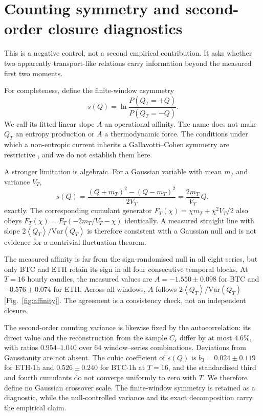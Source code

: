 \documentclass[aps,pre,twocolumn,superscriptaddress,floatfix,nofootinbib]{revtex4-2}
\newcommand{\eps}{\varepsilon}
\newcommand{\avg}[1]{\left\langle #1 \right\rangle}
\newcommand{\Var}{\mathrm{Var}}
\begin{document}
\iffalse
\section{Counting symmetry and second-order closure diagnostics}
\label{sec:identity}

This is a negative control, not a second empirical contribution. It asks
whether two apparently transport-like relations carry information beyond the
measured first two moments.

For completeness, define the finite-window asymmetry
\begin{equation}
  s(Q)=\ln\frac{P(Q_T=+Q)}{P(Q_T=-Q)} .
\end{equation}
We call its fitted linear slope $A$ an operational affinity. The name does not
make $Q_T$ an entropy production or $A$ a thermodynamic force. The conditions
under which a non-entropic current inherits a Gallavotti--Cohen symmetry are
restrictive \cite{barato2012}, and we do not establish them here.

A stronger limitation is algebraic. For a Gaussian variable with mean $m_T$
and variance $V_T$,
\begin{equation}
  s(Q)=\frac{(Q+m_T)^2-(Q-m_T)^2}{2V_T}
      =\frac{2m_T}{V_T}\,Q ,
  \label{eq:identity}
\end{equation}
exactly. The corresponding cumulant generator
$F_T(\chi)=\chi m_T+\chi^2V_T/2$ also obeys
$F_T(\chi)=F_T(-2m_T/V_T-\chi)$ identically. A measured straight line with
slope $2\avg{Q_T}/\Var(Q_T)$ is therefore consistent with a Gaussian null and
is not evidence for a nontrivial fluctuation theorem.

The measured affinity is far from the sign-randomised null in all eight
series, but only BTC and ETH retain its sign in all four consecutive temporal
blocks. At $T=16$ hourly candles, the measured values are
$A=-1.550\pm0.098$ for BTC and $-0.576\pm0.074$ for ETH. Across all windows,
$A$ follows $2\avg{Q_T}/\Var(Q_T)$ [Fig.~\ref{fig:affinity}]. The agreement is
a consistency check, not an independent closure.

The second-order counting variance is likewise fixed by the autocorrelation:
its direct value and the reconstruction from the sample $C_\eps$ differ by at
most $4.6\%$, with ratios $0.954$--$1.040$ over $64$ window--series
combinations. Deviations from Gaussianity are not absent. The cubic coefficient
of $s(Q)$ is $b_3=0.024\pm0.119$ for ETH$\cdot$1h and
$0.526\pm0.240$ for BTC$\cdot$1h at $T=16$, and the standardised third and
fourth cumulants do not converge uniformly to zero with $T$. We therefore
define no Gaussian crossover scale. The finite-window symmetry is retained as
a diagnostic, while the null-controlled variance and its exact decomposition
carry the empirical claim.
\end{document}
